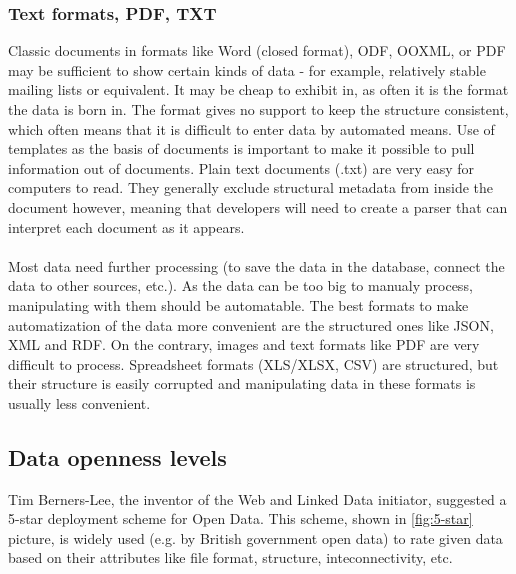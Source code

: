 \documentclass[thesis=B,english]{FITthesis}[2012/06/26]
\begin{document}
		\subsubsection{Text formats, PDF, TXT}
		Classic documents in formats like Word (closed format), ODF, OOXML, or PDF may be sufficient to show certain kinds of data - for example, relatively stable mailing lists or equivalent. It may be cheap to exhibit in, as often it is the format the data is born in. The format gives no support to keep the structure consistent, which often means that it is difficult to enter data by automated means. Use of templates as the basis of documents is important to make it possible to pull information out of documents.
Plain text documents (.txt) are very easy for computers to read. They generally exclude structural metadata from inside the document however, meaning that developers will need to create a parser that can interpret each document as it appears.
\paragraph{}Most data need further processing (to save the data in the database, connect the data to other sources, etc.). As the data can be too big to manualy process, manipulating with them should be automatable. The best formats to make automatization of the data more convenient are the structured ones like JSON, XML and RDF. On the contrary, images and text formats like PDF are very difficult to process. Spreadsheet formats (XLS/XLSX, CSV) are structured, but their structure is easily corrupted and manipulating data in these formats is usually less convenient.

	\subsection{Data openness levels}
	Tim Berners-Lee, the inventor of the Web and Linked Data initiator, suggested a 5-star deployment scheme for Open Data. This scheme, shown in \ref{fig:5-star} picture, is widely used (e.g. by British government open data) to rate given data based on their attributes like file format, structure, inteconnectivity, etc.
\end{document}
